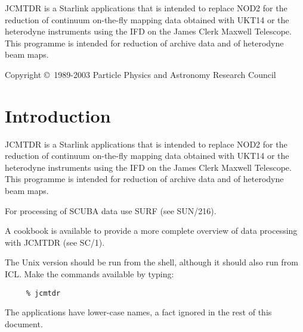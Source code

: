 \documentclass[twoside,11pt]{article}
\newcommand{\stardocinitials}  {SUN}
\newcommand{\stardocnumber}    {132.3}
\newcommand{\stardoccopyright} {Copyright \copyright\ 1989-2003 Particle Physics and Astronomy Research Council}
\newcommand{\stardocabstract}  {
  JCMTDR is a Starlink applications that is intended to replace NOD2 for the
  reduction of continuum on-the-fly mapping data obtained with UKT14 or the
  heterodyne instruments using the IFD on the James Clerk Maxwell Telescope.
  This programme is intended for reduction of archive data and of heterodyne
  beam maps.  }
\newcommand{\stardocname}{\stardocinitials /\stardocnumber}
\newenvironment{latexonly}{}{}
\newcommand{\xref}[3]{#1}
\newcommand{\xlabel}[1]{}
\renewcommand{\_}{\texttt{\symbol{95}}}
\renewcommand{\thepage}{\roman{page}}
\begin{document}
\stardocabstract

\begin{latexonly}
\newpage
\vspace*{\fill}
\stardoccopyright
\end{latexonly}

  \newpage
  \begin{latexonly}
    \setlength{\parskip}{0mm}
    \tableofcontents
    \setlength{\parskip}{\medskipamount}
    \markboth{\stardocname}{\stardocname}
  \end{latexonly}
\newpage
\renewcommand{\thepage}{\arabic{page}}
\setcounter{page}{1}

\section{Introduction\xlabel{introduction}\xlabel{JCMT_HELP}\xlabel{JCMT_XHELP}}

JCMTDR is a Starlink applications that is intended to replace NOD2 \cite{nod2}
for the reduction of continuum on-the-fly mapping data obtained with UKT14
\cite{ukt14} or the heterodyne instruments using the IFD on the James Clerk
Maxwell Telescope. This programme is intended for reduction of archive data
and of heterodyne beam maps.

For processing of SCUBA data use SURF (see \xref{SUN/216}{sun216}{}).

A cookbook is available to provide a more complete overview of data processing
with JCMTDR (see \xref{SC/1}{sc1}{}).

The Unix version should be run from the shell, although it should also
run from ICL. Make the commands available by typing:

\begin{verbatim}
     % jcmtdr
\end{verbatim}

The applications have lower-case names, a fact ignored in the rest of
this document.
\end{document}
